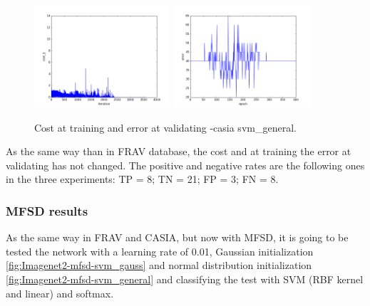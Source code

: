 \begin{figure}[htb]
\centering
\includegraphics[width=0.45\textwidth]{images/FRAv_casia_ImageNet/Imagenet2/casia/svm_general/cost.png}
\includegraphics[width=0.45\textwidth]{images/FRAv_casia_ImageNet/Imagenet2/casia/svm_general/error.png}
\caption{Cost at training and error at validating -casia svm\_general.} \label{fig:Imagenet2-casia-svm_general}
\end{figure}

As the same way than in FRAV database, the cost and at training the error at validating has not changed. The positive and negative rates are the following ones in the three experiments:  TP = 8; TN = 21; FP = 3; FN = 8.\\


\clearpage
\subsubsection{MFSD results}


As the same way in FRAV and CASIA, but now with MFSD, it is going to be tested the network with a learning rate of 0.01, Gaussian initialization \ref{fig:Imagenet2-mfsd-svm_gauss} and normal distribution initialization \ref{fig:Imagenet2-mfsd-svm_general} and classifying the test with SVM (RBF kernel and linear) and softmax.\\

